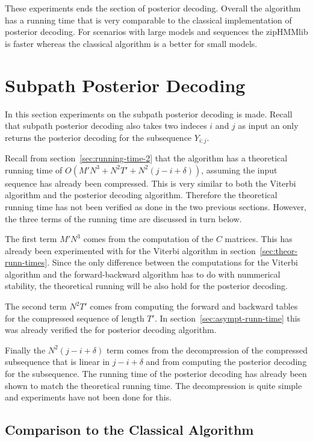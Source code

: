 These experiments ends the section of posterior decoding. Overall the algorithm
has a running time that is very comparable to the classical implementation of
posterior decoding. For scenarios with large models and sequences the zipHMMlib
is faster whereas the classical algorithm is a better for small models.

\section{Subpath Posterior Decoding}

In this section experiments on the subpath posterior decoding is
made. Recall that subpath posterior decoding also takes two indeces $i$ and
$j$ as input an only returns the posterior decoding for the subsequence
$Y_{i:j}$.

Recall from section~\ref{sec:running-time-2} that the algorithm has a
theoretical running time of $O(M' N^3 + N^2 T' + N^2 (j - i + \delta))$,
assuming the input sequence has already been compressed. This is very similar
to both the Viterbi algorithm and the posterior decoding algorithm. Therefore
the theoretical running time has not been verified as done in the two previous
sections. However, the three terms of the running time are discussed in turn
below.

The first term $M' N^3$ comes from the computation of the $C$ matrices. This
has already been experimented with for the Viterbi algorithm in
section~\ref{sec:theor-runn-times}. Since the only difference between the
computations for the Viterbi algorithm and the forward-backward algorithm has
to do with nummerical stability, the theoretical running will be also hold for
the posterior decoding.

The second term $N^2 T'$ comes from computing the forward and backward tables
for the compressed sequence of length $T'$. In
section~\ref{sec:asympt-runn-time} this was already verified the for posterior
decoding algorithm.

Finally the $N^2 (j - i + \delta)$ term comes from the decompression of the
compressed subsequence that is linear in $j - i + \delta$ and from computing
the posterior decoding for the subsequence. The running time of the posterior
decoding has already been shown to match the theoretical running time. The
decompression is quite simple and experiments have not been done for
this. 

\subsection{Comparison to the Classical Algorithm}

